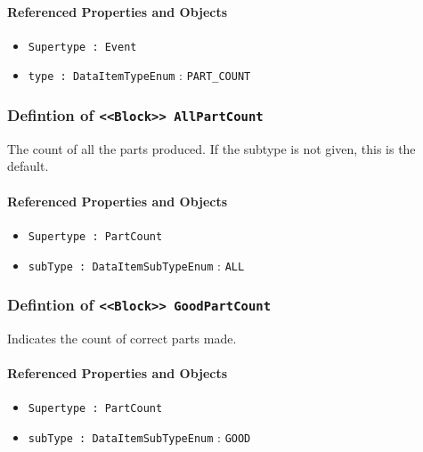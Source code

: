 \paragraph{Referenced Properties and Objects}

\begin{itemize}
\item \texttt{Supertype : Event}

\item \texttt{type : DataItemTypeEnum} : \texttt{PART_COUNT}

\end{itemize}
\FloatBarrier
\subsubsection{Defintion of \texttt{<<Block>> AllPartCount}}
  \label{type:AllPartCount}

\FloatBarrier

The count of all the parts produced.  If the subtype is not given, this is the default.

\FloatBarrier
\paragraph{Referenced Properties and Objects}

\begin{itemize}
\item \texttt{Supertype : PartCount}

\item \texttt{subType : DataItemSubTypeEnum} : \texttt{ALL}

\end{itemize}
\FloatBarrier
\subsubsection{Defintion of \texttt{<<Block>> GoodPartCount}}
  \label{type:GoodPartCount}

\FloatBarrier

Indicates the count of correct parts made.

\FloatBarrier
\paragraph{Referenced Properties and Objects}

\begin{itemize}
\item \texttt{Supertype : PartCount}

\item \texttt{subType : DataItemSubTypeEnum} : \texttt{GOOD}

\end{itemize}
\FloatBarrier
